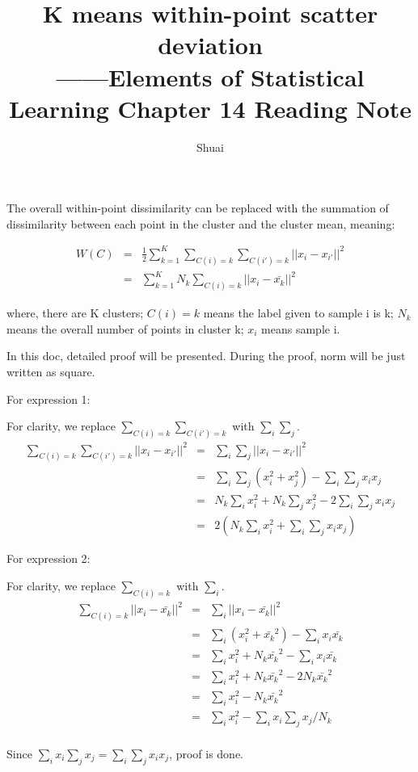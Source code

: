 \documentclass[a4paper]{article}
\title{K means within-point scatter deviation\\ \small ——Elements of Statistical
Learning Chapter 14 Reading Note}
\author{Shuai}
\begin{document}
\maketitle

The overall within-point dissimilarity can be replaced with the summation of
dissimilarity between each point in the cluster and the cluster mean, meaning:

\begin{eqnarray}
	W(C) &=& \frac{1}{2}\sum\limits^{K}_{k=1}\sum\limits_{C(i)=k}\sum\limits_{C(i')=k} || x_i - x_{i'} ||^2 \\
	     &=& \sum\limits^{K}_{k=1}N_k\sum\limits_{C(i)=k} || x_i - \bar{x_{k}} ||^2
\end{eqnarray}

where, there are K clusters; $C(i)=k$ means the label given to sample i
is k; $N_k$ means the overall number of points in cluster k; $x_i$ means
sample i.

In this doc, detailed proof will be presented. During the proof, norm will be just written as square.

For expression 1:

For clarity, we replace $\sum\limits_{C(i)=k}\sum\limits_{C(i')=k}$ with $\sum\limits_{i}\sum\limits_{j}$.
\begin{eqnarray}
	\sum\limits_{C(i)=k}\sum\limits_{C(i')=k} || x_i - x_{i'} ||^2 &=&\sum\limits_{i}\sum\limits_{j} || x_i - x_{i'} ||^2\\
	&=& \sum\limits_{i}\sum\limits_{j}(x_i^2 + x_j^2) - \sum\limits_{i}\sum\limits_{j}x_ix_j\\
	&=& N_k\sum\limits_{i}x_i^2 + N_k\sum\limits_{j}x_j^2 - 2\sum\limits_{i}\sum\limits_{j}x_ix_j\\
	&=& 2(N_k\sum\limits_{i}x_i^2 + \sum\limits_{i}\sum\limits_{j}x_ix_j)
\end{eqnarray}

For expression 2:

For clarity, we replace $\sum\limits_{C(i)=k}$ with $\sum\limits_{i}$.
\begin{eqnarray}
	\sum\limits_{C(i)=k} || x_i - \bar{x_{k}} ||^2 &=&\sum\limits_{i} || x_i - \bar{x_{k}} ||^2\\
	&=& \sum\limits_{i}(x_i^2 + \bar{x_k}^2) - \sum\limits_{i}x_i\bar{x_k}\\
	&=& \sum\limits_{i}x_i^2 + N_k\bar{x_k}^2 - \sum\limits_{i}x_i\bar{x_k}\\
	&=& \sum\limits_{i}x_i^2 + N_k\bar{x_k}^2 - 2N_k\bar{x_k}^2\\
	&=& \sum\limits_{i}x_i^2 - N_k\bar{x_k}^2\\
	&=& \sum\limits_{i}x_i^2 - \sum\limits_{i}x_i\sum\limits_{j}x_j/N_k\\
\end{eqnarray}

Since $\sum\limits_{i}x_i\sum\limits_{j}x_j = \sum\limits_{i}\sum\limits_{j}x_ix_j$, proof is done.
\end{document}
